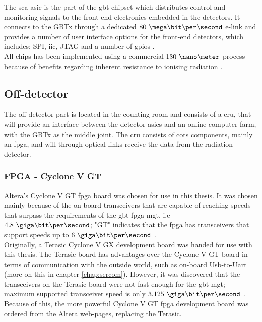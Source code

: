 \documentclass[main.tex]{subfiles}
\begin{document}
The \gls{sca} \gls{asic} is the part of the \gls{gbt} chipset which distributes control and monitoring signals to the front-end electronics embedded in the detectors. It connects to the GBTx through a dedicated $80~\mega\bit\per\second$ e-link and provides a number of user interface options for the front-end detectors, which includes: SPI, \acrshort{iic}, JTAG and a number of \acrshort{gpio}s \cite{gbtsca15}. \\

\noindent
All chips has been implemented using a commercial $130~\nano\meter$ process because of benefits regarding inherent resistance to ionising radiation \cite{gbtpro10}.

\subsection{Off-detector}
The off-detector part is located in the counting room and consists of a \gls{cru}, that will provide an interface between the detector \acrshort{asic}s and an online computer farm, with the GBTx as the middle joint. The \gls{cru} consists of \gls{cots} components, mainly an \gls{fpga}, and will through optical links receive the data from the radiation detector.

\subsubsection{FPGA - Cyclone V GT} \label{sec:cyclone}

Altera's Cyclone V GT \gls{fpga} board was chosen for use in this thesis. It was chosen mainly because of the on-board transceivers that are capable of reaching speeds that surpass the requirements of the \gls{gbt}-\gls{fpga} \gls{mgt}, i.e $4.8~\giga\bit\per\second$; "GT" indicates that the \gls{fpga} has transceivers that support speeds up to $6~\giga\bit\per\second$ \cite{altera_cvoverview15}.\\
Originally, a Terasic Cyclone V GX development board was handed for use with this thesis. The Terasic board has advantages over the Cyclone V GT board in terms of communication with the outside world, such as on-board Usb-to-Uart (more on this  in chapter \ref{chap:sercom}). However, it was discovered that the transceivers on the Terasic board were not fast enough for the \gls{gbt} \gls{mgt}; maximum supported transceiver speed is only $3.125~\giga\bit\per\second$ \cite{altera_cvoverview15}. Because of this, the more powerful Cyclone V GT \gls{fpga} development board was ordered from the Altera web-pages, replacing the Terasic.
\end{document}
